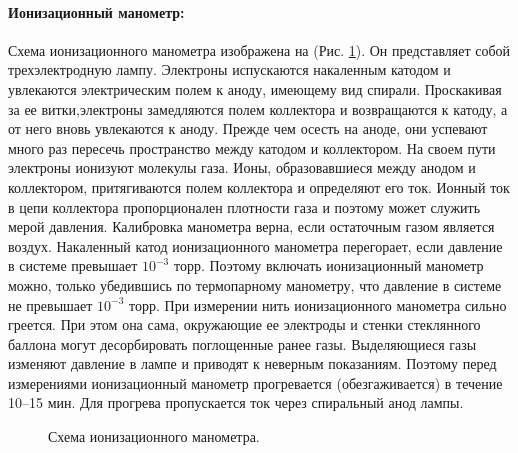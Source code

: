 \documentclass[a4paper,12pt]{article}
\begin{document}
    \paragraph{Ионизационный манометр:}
    Схема ионизационного манометра изображена на (Рис. \ref{ris:ionizacionni_monometr}). Он представляет собой трехэлектродную лампу. Электроны испускаются накаленным катодом и увлекаются электрическим полем к аноду, имеющему вид спирали. Проскакивая за ее витки,электроны замедляются полем коллектора и возвращаются к катоду, а от него вновь увлекаются к аноду. Прежде чем осесть на аноде, они успевают много раз пересечь пространство между катодом и коллектором. На своем пути электроны ионизуют молекулы газа. Ионы, образовавшиеся между анодом и коллектором, притягиваются полем коллектора и определяют его ток. Ионный ток в цепи коллектора пропорционален плотности газа и поэтому может служить мерой давления. Калибровка манометра верна, если остаточным газом является воздух. Накаленный катод ионизационного манометра перегорает, если давление в системе превышает $10^{-3}$ торр. Поэтому включать ионизационный манометр можно, только убедившись по термопарному манометру, что давление в системе не превышает $10^{-3}$ торр. При измерении нить ионизационного манометра сильно греется. При этом она сама, окружающие ее электроды и стенки стеклянного баллона могут десорбировать поглощенные ранее газы. Выделяющиеся газы изменяют давление в лампе и приводят к неверным показаниям. Поэтому перед измерениями ионизационный манометр прогревается (обезгаживается) в течение 10–15 мин. Для прогрева пропускается ток через спиральный анод лампы.

    \vspace{1cm}

    \begin{figure}[h]
        \caption{Схема ионизационного манометра.}
        \label{ris:ionizacionni_monometr}
    \end{figure}
\end{document}
